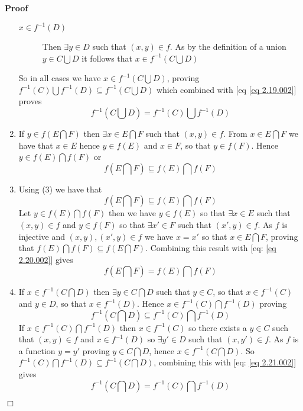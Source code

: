 \documentclass{book}
\newenvironment{proof}{\noindent\textbf{Proof\ }}{\hspace*{\fill}$\Box$\medskip}
\begin{document}
\begin{proof}
\begin{enumerate}
\begin{description}
      \item[$x \in f^{- 1} (D)$] Then $\exists y \in D$ such that $(x, y) \in
      f$. As by the definition of a union $y \in C \bigcup D$ it follows that
      $x \in f^{- 1} \left( C \bigcup D \right)$
    \end{description}
    So in all cases we have $x \in f^{- 1} \left( C \bigcup D \right)$,
    proving $f^{- 1} (C) \bigcup f^{- 1} (D) \subseteq f^{- 1} \left( C
    \bigcup D \right)$ which combined with [eq \ref{eq 2.19.002}] proves
    \[ f^{- 1} \left( C \bigcup D \right) = f^{- 1} (C) \bigcup f^{- 1} (D)
    \]
    
    
    \item If $y \in f \left( E \bigcap F \right)$ then $\exists x \in E
    \bigcap F$ such that $(x, y) \in f$. From $x \in E \bigcap F$ we have that
    $x \in E$ hence $y \in f (E)$ and $x \in F$, so that $y \in f (F)$. Hence
    $y \in f (E) \bigcap f (F)$ or
    \[ f \left( E \bigcap F \right) \subseteq f (E) \bigcap f (F) \]
    \item Using (3) we have that
    \begin{equation}
      \label{eq 2.20.002} f \left( E \bigcap F \right) \subseteq f (E) \bigcap
      f (F)
    \end{equation}
    Let $y \in f (E) \bigcap f (F)$ then we have $y \in f (E)$ so that
    $\exists x \in E$ such that $(x, y) \in f$ and $y \in f (F)$ so that
    $\exists x' \in F$ such that $(x', y) \in f$. As $f$ is injective and $(x,
    y), (x', y) \in f$ we have $x = x'$ so that $x \in E \bigcap F$, proving
    that $f (E) \bigcap f (F) \subseteq f \left( E \bigcap F \right)$.
    Combining this result with [eq: \ref{eq 2.20.002}] gives
    \[ f \left( E \bigcap F \right) = f (E) \bigcap f (F) \]
    \item If $x \in f^{- 1} \left( C \bigcap D \right)$ then $\exists y \in C
    \bigcap D$ such that $y \in C$, so that $x \in f^{- 1} (C)$ and $y \in D$,
    so that $x \in f^{- 1} (D)$. Hence $x \in f^{- 1} (C) \bigcap f^{- 1} (D)$
    proving
    \begin{equation}
      \label{eq 2.21.002} f^{- 1} \left( C \bigcap D \right) \subseteq f^{- 1}
      (C) \bigcap f^{- 1} (D)
    \end{equation}
    If $x \in f^{- 1} (C) \bigcap f^{- 1} (D)$ then $x \in f^{- 1} (C)$ so
    there exists a $y \in C$ such that $(x, y) \in f$ and $x \in f^{- 1} (D)$
    so $\exists y' \in D$ such that $(x, y') \in f$. As $f$ is a function $y =
    y'$ proving $y \in C \bigcap D$, hence $x \in f^{- 1} \left( C \bigcap D
    \right)$. So $f^{- 1} (C) \bigcap f^{- 1} (D) \subseteq f^{- 1} \left( C
    \bigcap D \right)$, combining this with [eq: \ref{eq 2.21.002}] gives
    \[ f^{- 1} \left( C \bigcap D \right) = f^{- 1} (C) \bigcap f^{- 1} (D)
    \]
  \end{enumerate}
\end{proof}
\end{document}
